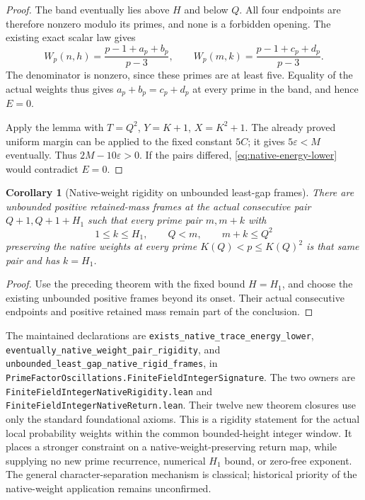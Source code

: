 \documentclass[11pt]{article}
\newtheorem{corollary}[theorem]{Corollary}
\begin{document}
\begin{proof}
The band eventually lies above \(H\) and below \(Q\).
All four endpoints are therefore nonzero modulo its primes, and none
is a forbidden opening.  The existing exact scalar law gives
\[
 W_p(n,h)=\frac{p-1+a_p+b_p}{p-3},\qquad
 W_p(m,k)=\frac{p-1+c_p+d_p}{p-3}.
\]
The denominator is nonzero, since these primes are at least five.
Equality of the actual weights thus gives
\(a_p+b_p=c_p+d_p\) at every prime in the band, and hence \(E=0\).

Apply the lemma with \(T=Q^2\), \(Y=K+1\), \(X=K^2+1\).
The already proved uniform margin can be applied to the fixed constant
\(5C\); it gives \(5\varepsilon<M\) eventually.  Thus
\(2M-10\varepsilon>0\).  If the pairs differed,
\eqref{eq:native-energy-lower} would contradict \(E=0\).
\end{proof}

\begin{corollary}[Native-weight rigidity on unbounded least-gap frames]
\label{cor:native-least-gap-return}
There are unbounded positive retained-mass frames at the actual
consecutive pair \(Q+1,Q+1+H_1\) such that every prime pair \(m,m+k\) with
\[
 1\le k\le H_1,\qquad Q<m,\qquad m+k\le Q^2
\]
preserving the native weights at every prime
\(K(Q)<p\le K(Q)^2\) is that same pair and has \(k=H_1\).
\end{corollary}
\begin{proof}
Use the preceding theorem with the fixed bound \(H=H_1\), and choose
the existing unbounded positive frames beyond its onset.
Their actual consecutive endpoints and positive retained mass remain
part of the conclusion.
\end{proof}

The maintained declarations are
\texttt{exists\_native\_trace\_energy\_lower},
\texttt{eventually\_native\_weight\_pair\_rigidity}, and
\texttt{unbounded\_least\_gap\_native\_rigid\_frames}, in
\texttt{PrimeFactorOscillations.FiniteFieldIntegerSignature}.
The two owners are \texttt{FiniteFieldIntegerNativeRigidity.lean} and
\texttt{FiniteFieldIntegerNativeReturn.lean}.
Their twelve new theorem closures use only the standard foundational
axioms.  This is a rigidity statement for the actual local probability
weights within the common bounded-height integer window.
It places a stronger constraint on a native-weight-preserving return
map, while supplying no new prime recurrence, numerical \(H_1\) bound,
or zero-free exponent.  The general character-separation mechanism is
classical; historical priority of the native-weight application remains
unconfirmed.
\end{document}
